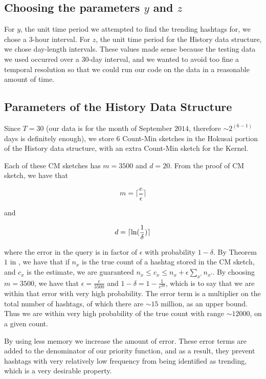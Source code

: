 \documentclass[twoside]{article}
\newcommand{\cc}[1]
 {\textbf{\cite{#1}}}
\begin{document}
{%
\subsection{Choosing the parameters $y$ and $z$}
For $y$, the unit time period we attempted to find the trending hashtags for, we chose a $3$-hour interval.
For $z$, the unit time period for the History data structure, we chose day-length intervals. These values made sense because the testing data we used occurred over a $30$-day interval, and we wanted to avoid too fine a temporal resolution so that we could run our code on the data in a reasonable amount of time.

\subsection{Parameters of the History Data Structure}
Since $T = 30$ (our data is for the month of September $2014$, therefore $\sim 2^{(6-1)}$ days is definitely enough), we store $6$ Count-Min
sketches in the Hokusai portion of the History data structure, with an extra Count-Min 
sketch for the Kernel. 

Each of these CM sketches has $m = 3500$ and $d = 20$. From the proof of CM sketch, we have that

\begin{equation}
\label{eq:error_control}
m = \lceil \frac{e}{\epsilon} \rceil
\end{equation}

and 

\begin{equation}
\label{eq:certainty_control}
d = \lceil \textnormal{ln}(\frac{1}{\delta}) \rceil
\end{equation}

where the error in the query is in factor of $\epsilon$ with probability $1 - \delta$. By Theorem $1$ in \cc{Matusevych:2012}, we have that if $n_x$ is the true count of a hashtag stored in the CM sketch, and $c_x$ is the estimate, we are guaranteed $n_x \leq c_x \leq n_x + \epsilon \sum_{x'} n_{x'}$. 
By choosing $m = 3500$, we have that $\epsilon = \frac{e}{3500}$ and $1 - \delta = 1 - \frac{1}{e^{20}}$, which is to say that we are within that error with very high probability. The error term is a multiplier on the total number of hashtags, of which there are $\sim 15$ million, as an upper bound. Thus we are within very high probability of the true count with range $\sim 12000$, on a given count. 

By using less memory we increase the amount of error.  These error terms are added to the denominator of our priority function, and as a result, they prevent hashtags with very relatively low frequency from being identified as trending, which is a very desirable property.

}
\end{document}
